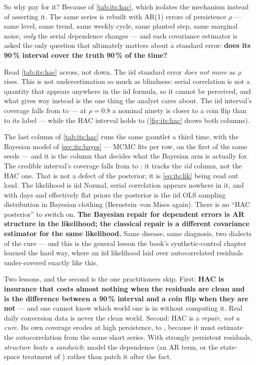 So why pay for it? Because of \cref{tab:its:hac}, which isolates the mechanism instead of asserting
it. The same series is rebuilt with AR(1) errors of persistence $\rho$ --- same level, same trend,
same weekly cycle, same planted \pp{+\nbTenTrueLift} step, same marginal noise, \emph{only} the
serial dependence changes --- and each covariance estimator is asked the only question that
ultimately matters about a standard error: \textbf{does its 90\,\% interval cover the truth
90\,\% of the time?}




Read \cref{tab:its:hac} across, not down. The iid standard error \emph{does not move} as $\rho$
rises. This is not underestimation so much as blindness: serial correlation is not a quantity that
appears anywhere in the iid formula, so it cannot be perceived, and what gives way instead is the
one thing the analyst cares about. The iid interval's coverage falls from
\pc{\nbTenArCovIidZero} to \pc{\nbTenArCovIidEight} --- at $\rho = 0.8$ a nominal ninety is closer
to a coin flip than to its label --- while the HAC interval holds \pc{\nbTenArCovHacZero} to
\pc{\nbTenArCovHacEight} (\cref{fig:its:hac} draws both columns).

The last column of \cref{tab:its:hac} runs the same gauntlet a third time, with the Bayesian model
of \cref{sec:its:bayes} --- \nbTenArBayesReps{} MCMC fits per row, on the first \nbTenArBayesReps{}
of the same seeds --- and it is the column that decides what the Bayesian arm is actually for. The
credible interval's coverage falls from \pc{\nbTenArCovBayesZero} to \pc{\nbTenArCovBayesEight}: it
tracks the \emph{iid} column, not the HAC one. That is not a defect of the posterior; it is
\cref{eq:its:lik} being read out loud. The likelihood is iid Normal, serial correlation appears
nowhere in it, and with \nbTenNPre{} days and effectively flat priors the posterior is the iid OLS
sampling distribution in Bayesian clothing (Bernstein--von Mises again). There is no ``HAC
posterior'' to switch on. \textbf{The Bayesian repair for dependent errors is AR structure in the
likelihood; the classical repair is a different covariance estimator for the same likelihood.} Same
disease, same diagnosis, two dialects of the cure --- and this is the general lesson the book's
synthetic-control chapter learned the hard way, where an iid likelihood laid over autocorrelated
residuals under-covered exactly like this.

Two lessons, and the second is the one practitioners skip. First: \textbf{HAC is insurance that
costs almost nothing when the residuals are clean and is the difference between a 90\,\% interval
and a coin flip when they are not} --- and one cannot know which world one is in without computing
it. Real daily conversion data is never the clean world. Second: HAC is a \emph{repair, not a
cure}. Its own coverage erodes at high persistence, to \pc{\nbTenArCovHacEight}, because it must
estimate the autocorrelation from the same short series. With strongly persistent residuals,
\emph{structure beats a sandwich}: model the dependence (an AR term, or the state-space treatment
of \citealt{brodersen2015}) rather than patch it after the fact.

